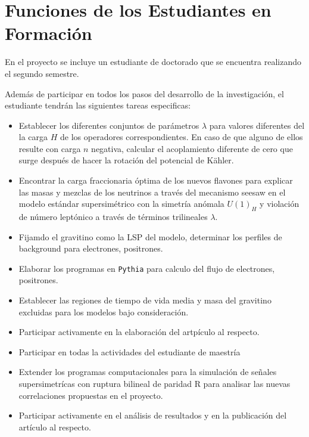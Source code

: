 \section{ Funciones de los Estudiantes en Formación }



En el proyecto se incluye un estudiante de doctorado que se encuentra realizando
el segundo semestre.

Además de participar en todos los pasos del desarrollo de la
investigación, el estudiante  tendrán las siguientes
tareas especificas:

\begin{itemize}
\item Establecer los diferentes conjuntos de parámetros $\lambda$ para valores diferentes del la carga $H$ de los operadores correspondientes. En caso de que alguno de ellos resulte con carga $n$ negativa, calcular el acoplamiento diferente de cero que surge después de hacer la rotación del potencial de K\"ahler.
\item Encontrar la carga fraccionaria óptima de los nuevos flavones para explicar las masas y mezclas de los neutrinos a través del mecanismo seesaw en el modelo estándar supersimétrico con la simetría anómala $U(1)_H$ y violación de número leptónico a través de términos trilineales $\lambda$.
\item Fijamdo el gravitino como la LSP del modelo, determinar los perfiles de background para electrones, positrones.
\item Elaborar los programas en \texttt{Pythia} para calculo del flujo de electrones, positrones.
\item Establecer las regiones de tiempo de vida media y masa del gravitino excluidas para los modelos bajo consideración.
\item Participar activamente en la elaboración del artpículo al respecto.
\item Participar en todas la actividades del estudiante de maestría
\item Extender los programas computacionales para la simulación de señales supersimetrícas con ruptura bilineal de paridad R para analisar las nuevas correlaciones propuestas en el proyecto.
\item Participar activamente en el análisis de resultados y en la
  publicación del artículo al respecto.
\end{itemize}


